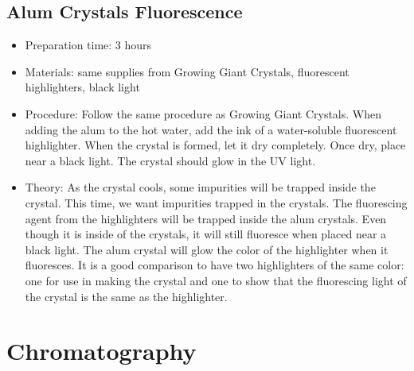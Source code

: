 \subsection{Alum Crystals Fluorescence }
\begin{itemize}
\item{Preparation time: 3 hours}
\item{Materials: same supplies from Growing Giant Crystals, fluorescent highlighters, black light}
\item{Procedure: Follow the same procedure as Growing Giant Crystals. When adding the alum to the hot water, add the ink of a water-soluble fluorescent highlighter. When the crystal is formed, let it dry completely. Once dry, place near a black light. The crystal should glow in the UV light.}
\item{Theory: As the crystal cools, some impurities will be trapped inside the crystal. This time, we want impurities trapped in the crystals. The fluorescing agent from the highlighters will be trapped inside the alum crystals. Even though it is inside of the crystals, it will still fluoresce when placed near a black light. The alum crystal will glow the color of the highlighter when it fluoresces. It is a good comparison to have two highlighters of the same color: one for use in making the crystal and one to show that the fluorescing light of the crystal is the same as the highlighter.}
\end{itemize}

\section{Chromatography}

